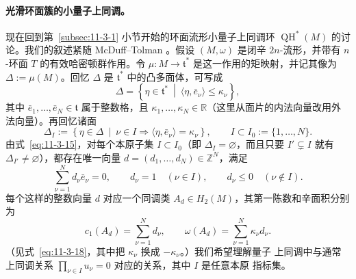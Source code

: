 \paragraph{光滑环面簇的小量子上同调。}
现在回到第~\ref{subsec:11-3-1} 小节开始的环面流形小量子上同调环
$\operatorname{QH}^*(M)$ 的讨论。我们的叙述紧随 McDuff--Tolman 。假设
$(M,\omega)$ 是闭辛 $2n$-流形，并带有 $n$-环面 $T$ 的有效哈密顿群作用。令
$\mu:M\to\mathfrak t^*$ 是这一作用的矩映射，并记其像为 $\Delta:=\mu(M)$。回忆
$\Delta$ 是 $\mathfrak t^*$ 中的凸多面体，可写成
\[
  \Delta=\left\{\eta\in\mathfrak t^*\ \middle|\
  \langle\eta,\bar e_\nu\rangle\le\kappa_\nu\right\},
\]
其中 $\bar e_1,\ldots,\bar e_N\in\mathfrak t$ 属于整数格，且
$\kappa_1,\ldots,\kappa_N\in\mathbb R$（这里从面片的内法向量改用外法向量）。再回忆诸面
\[
  \Delta_I:=\left\{\eta\in\Delta\ \middle|\
  \nu\in I\Longrightarrow\langle\eta,\bar e_\nu\rangle=\kappa_\nu\right\},
  \qquad I\subset I_0:=\{1,\ldots,N\}.
\]
由式~\eqref{eq:11-3-15}，对每个本原子集 $I\subset I_0$（即
$\Delta_I=\varnothing$，而且只要 $I'\subsetneq I$ 就有
$\Delta_{I'}\ne\varnothing$），都存在唯一向量
$d=(d_1,\ldots,d_N)\in\mathbb Z^N$，满足
\begin{equation}\label{eq:11-4-8}
  \sum_{\nu=1}^N d_\nu\bar e_\nu=0,
  \qquad
  d_\nu=1\quad(\nu\in I),
  \qquad
  d_\nu\le0\quad(\nu\notin I).
\end{equation}
每个这样的整数向量 $d$ 对应一个同调类 $A_d\in H_2(M)$，其第一陈数和辛面积分别为
\begin{equation}\label{eq:11-4-9}
  c_1(A_d)=\sum_{\nu=1}^N d_\nu,
  \qquad
  \omega(A_d)=\sum_{\nu=1}^N\kappa_\nu d_\nu.
\end{equation}
（见式~\eqref{eq:11-3-18}，其中把 $\kappa_\nu$ 换成 $-\kappa_\nu$。）我们希望理解量子
上同调中与通常上同调关系 $\prod_{\nu\in I}u_\nu=0$ 对应的关系，其中 $I$ 是任意本原
指标集。

